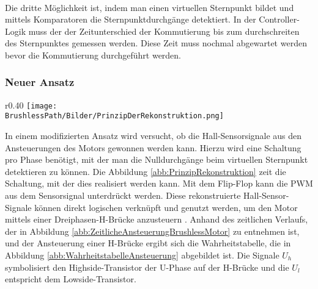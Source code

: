        \\
        Die dritte Möglichkeit ist, indem man einen virtuellen Sternpunkt bildet und mittels Komparatoren die Sternpunktdurchgänge detektiert. In der Controller-Logik muss der der Zeitunterschied der Kommutierung bis zum durchschreiten des Sternpunktes gemessen werden. Diese Zeit muss nochmal abgewartet werden bevor die Kommutierung durchgeführt werden.
    
    \subsubsection{Neuer Ansatz}
        \begin{wrapfigure}{r}{0.40\textwidth}
           	\texttt{[image: \\BrushlessPath/Bilder/PrinzipDerRekonstruktion.png]}
           	\centering
           	\caption[Schema des Rekonstruktionsprinzip]{Schema des Rekonstruktionsprinzip \cite{HSLU:Pluess}}
            \label{abb:PrinzipRekonstruktion}
        \end{wrapfigure}
        In einem modifizierten Ansatz wird versucht, ob die Hall-Sensorsignale aus den Ansteuerungen des Motors gewonnen werden kann. Hierzu wird eine Schaltung pro Phase benötigt, mit der man die Nulldurchgänge beim virtuellen Sternpunkt detektieren zu können. Die Abbildung \ref{abb:PrinzipRekonstruktion} zeit die Schaltung, mit der dies realisiert werden kann. Mit dem Flip-Flop kann die PWM aus dem Sensorsignal unterdrückt werden. Diese rekonstruierte Hall-Sensor-Signale können direkt logischen verknüpft und genutzt werden, um den Motor mittels einer Dreiphasen-H-Brücke anzusteuern \cite{HSLU:Pluess}. Anhand des zeitlichen Verlaufs, der in Abbildung \ref{abb:ZeitlicheAnsteuerungBrushlessMotor} zu entnehmen ist, und der Ansteuerung einer H-Brücke ergibt sich die Wahrheitstabelle, die in Abbildung \ref{abb:WahrheitstabelleAnsteuerung} abgebildet ist. Die Signale $U_h$ symbolisiert den Highside-Transistor der U-Phase auf der H-Brücke und die $U_l$ entspricht dem Lowside-Transistor.\\      
        
